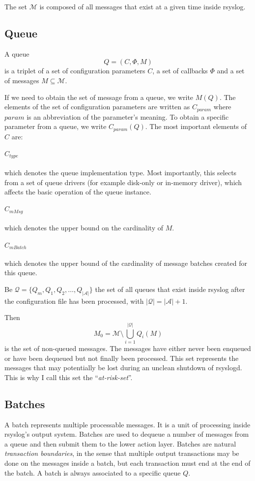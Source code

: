 \documentclass[a4paper,10pt]{article}
\newcommand{\MM}{\mathcal{M}}
\newcommand{\QQ}{\mathcal{Q}}
\newcommand{\AAA}{\mathcal{A}}
\begin{document}
The set $\MM$ is composed of all messages that exist at a given time inside rsyslog.

\subsection{Queue}
A queue
$$Q = (C, \Phi, M)$$
is a triplet of a set of configuration parameters $C$, a set of callbacks $\Phi$ and a set of messages $M \subseteq \MM$.

If we need to obtain the set of message from a queue, we write $M(Q)$. The elements of the set of configuration parameters are written as $C_{param}$ where $param$ is an abbreviation of the parameter's meaning. To obtain a specific parameter from a queue, we write $C_{param}(Q)$. The most important elements of $C$ are:

\paragraph{$C_{type}$} which denotes the queue implementation type. Most importantly, this selects from a set of queue drivers (for example disk-only or in-memory driver), which affects the basic operation of the queue instance.

\paragraph{$C_{mMsg}$} which denotes the upper bound on the cardinality of $M$.

\paragraph{$C_{mBatch}$} which denotes the upper bound of the cardinality of message batches created for this queue.

Be $\QQ = \{Q_m, Q_1, Q_2, \ldots, Q_{|\AAA|}\}$ the set of all queues that exist inside rsyslog after the configuration file has been processed, with $|\QQ| = |\AAA| + 1$.

Then
$$M_0 = \MM \setminus \bigcup_{i=1}^{|\QQ|} Q_i(M)$$
is the set of non-queued messages. The messages have either never been enqueued or have been dequeued but not finally been processed. This set represents the messages that may potentially be lost during an unclean shutdown of rsyslogd. This is why I call this set the ``\emph{at-risk-set}''.


\subsection{Batches}
A batch represents multiple processable messages. It is a unit of processing inside rsyslog's output system. Batches are used to dequeue a number of messages from a queue and then submit them to the lower action layer. Batches are natural \emph{transaction boundaries}, in the sense that multiple output transactions may be done on the messages inside a batch, but each transaction must end at the end of the batch. A batch is always associated to a specific queue $Q$.
\end{document}
